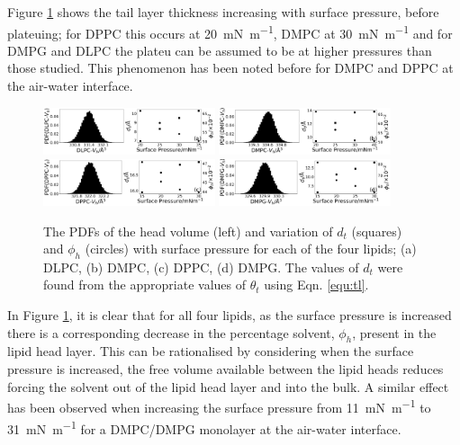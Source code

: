 \documentclass[twocolumn,a4paper]{paper}
\begin{document}
Figure \ref{fig:lipresults} shows the tail layer thickness increasing with surface pressure, before plateuing; for DPPC this occurs at \SI{20}{\milli\newton\per\meter}, DMPC at \SI{30}{\milli\newton\per\meter} and for DMPG and DLPC the plateu can be assumed to be at higher pressures than those studied.
This phenomenon has been noted before for DMPC\cite{Bayerl1990} and DPPC\cite{Campbell2018} at the air-water interface.

%
\begin{figure}
	\centering
	\includegraphics[width=0.45\textwidth]{figures/dlpc_vh_dt_phi}
	\includegraphics[width=0.45\textwidth]{figures/dmpc_vh_dt_phi}
	\includegraphics[width=0.45\textwidth]{figures/dppc_vh_dt_phi}
	\includegraphics[width=0.45\textwidth]{figures/dmpg_vh_dt_phi}
	\caption{\small The PDFs of the head volume (left) and variation of $d_t$ (squares) and $\phi_h$ (circles) with surface pressure for each of the four lipids; (a) DLPC, (b) DMPC, (c) DPPC, (d) DMPG. The values of $d_t$ were found from the appropriate values of $\theta_t$ using Eqn. \ref{equ:tl}.}
	\label{fig:lipresults}
\end{figure}
%

In Figure \ref{fig:lipresults}, it is clear that for all four lipids, as the surface pressure is increased there is a corresponding decrease in the percentage solvent, $\phi_h$, present in the lipid head layer.
This can be rationalised by considering when the surface pressure is increased, the free volume available between the lipid heads reduces forcing the solvent out of the lipid head layer and into the bulk.
A similar effect has been observed when increasing the surface pressure from \SI{11}{\milli\newton\per\meter} to \SI{31}{\milli\newton\per\meter} for a DMPC/DMPG monolayer at the air-water interface\cite{Bayerl1990}.
\end{document}

